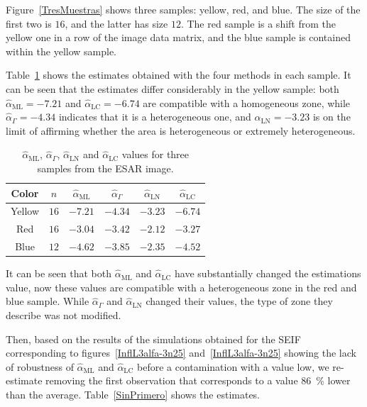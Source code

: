 \documentclass[twocolumn]{svjour3}
\begin{document}
Figure~\ref{TresMuestras} shows three samples: yellow, red, and blue. 
The size of the first two is $16$, and the latter has size $12$. 
The red sample is a shift from the yellow one in a row of the image data matrix, and the blue sample is contained within the yellow sample.

Table~\ref{TablaTresMuestras} shows the estimates obtained with the four methods in each sample. 
It can be seen that the estimates differ considerably in the yellow sample: 
both $\widehat{\alpha}_{\text{{ML}}}=-7.21$ and $\widehat{\alpha}_{\text{{LC}}}=-6.74$ are compatible with a homogeneous zone, while $\widehat{\alpha}_{\Gamma}=-4.34$ indicates that it is a heterogeneous one, and $\widehat{\alpha}_{\text{{LN}}}=-3.23$ is on the limit of affirming whether the area is heterogeneous or extremely heterogeneous.

\begin{table}[hbt]
	\centering
	\caption{\label{TablaTresMuestras} $\widehat{\alpha}_{\text{{ML}}}$, $\widehat{\alpha}_{\Gamma}$, $\widehat{\alpha}_{\text{{LN}}}$ and $\widehat{\alpha}_{\text{{LC}}}$ values for three samples from the ESAR image.}
	\begin{tabular}{c*5{c}}
		\toprule
		Color       &  $n$    &  $\widehat{\alpha}_{\text{{ML}}}$    &  $\widehat{\alpha}_{\Gamma}$  &  $\widehat{\alpha}_{\text{{LN}}}$ &  $\widehat{\alpha}_{\text{{LC}}}$\\
		\midrule
		Yellow      & $16$  & $-7.21$ & $-4.34$ & $-3.23$ & $-6.74$\\
		Red         & $16$  & $-3.04$ & $-3.42$ & $-2.12$ & $-3.27$\\
		Blue        & $12$  & $-4.62$ & $-3.85$ & $-2.35$ & $-4.52$\\
		\bottomrule
	\end{tabular}
\end{table} 

It can be seen that both $\widehat{\alpha}_{\text{{ML}}}$ and $\widehat{\alpha}_{\text{{LC}}}$ have substantially changed the estimations value, now these values are compatible with a heterogeneous zone in the red and blue sample. While $\widehat{\alpha}_{\Gamma}$ and $\widehat{\alpha}_{\text{{LN}}}$ changed their values, the type of zone they describe was not modified.

Then, based on the results of the simulations obtained for the SEIF corresponding to figures~\ref{InflL3alfa-3n25} and~\ref{InflL3alfa-3n25} showing the lack of robustness of $\widehat{\alpha}_{\text{{ML}}}$ and $\widehat{\alpha}_{\text{{LC}}}$ before a contamination with a value low, we re-estimate removing the first observation that corresponds to a value \SI{86}{\percent} lower than the average. 
Table~\ref{SinPrimero} shows the estimates.
\end{document}
